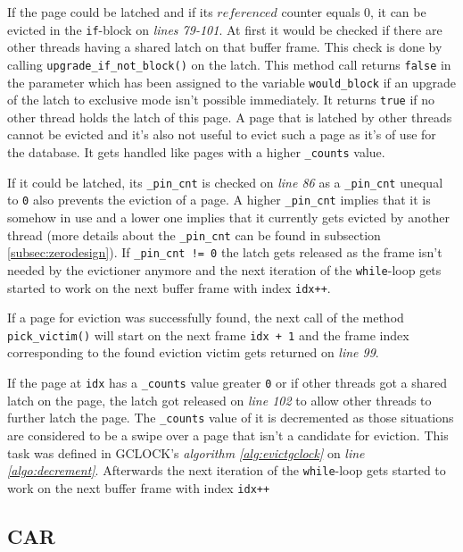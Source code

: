     If the page could be latched and if its $referenced$ counter equals $0$, it can be evicted in the \lstinline{if}-block on \emph{lines 79-101}. At first it would be checked if there are other threads having a shared latch on that buffer frame. This check is done by calling \lstinline{upgrade_if_not_block()} on the latch. This method call returns \lstinline{false} in the parameter which has been assigned to the variable \lstinline{would_block} if an upgrade of the latch to exclusive mode isn't possible immediately. It returns \lstinline{true} if no other thread holds the latch of this page. A page that is latched by other threads cannot be evicted and it's also not useful to evict such a page as it's of use for the database. It gets handled like pages with a higher \lstinline{_counts} value.

    If it could be latched, its \lstinline{_pin_cnt} is checked on \emph{line 86} as a \lstinline{_pin_cnt} unequal to \lstinline{0} also prevents the eviction of a page. A higher \lstinline{_pin_cnt} implies that it is somehow in use and a lower one implies that it currently gets evicted by another thread (more details about the \lstinline{_pin_cnt} can be found in subsection \ref{subsec:zerodesign}). If \lstinline{_pin_cnt != 0} the latch gets released as the frame isn't needed by the evictioner anymore and the next iteration of the \lstinline{while}-loop gets started to work on the next buffer frame with index \lstinline{idx++}.

    If a page for eviction was successfully found, the next call of the method \lstinline{pick_victim()} will start on the next frame \lstinline{idx + 1} and the frame index corresponding to the found eviction victim gets returned on \emph{line 99}.

    If the page at \lstinline{idx} has a \lstinline{_counts} value greater \lstinline{0} or if other threads got a shared latch on the page, the latch got released on \emph{line 102} to allow other threads to further latch the page. The \lstinline{_counts} value of it is decremented as those situations are considered to be a swipe over a page that isn't a candidate for eviction. This task was defined in GCLOCK's \emph{algorithm \ref{alg:evictgclock}} on \emph{line \ref{algo:decrement}}. Afterwards the next iteration of the \lstinline{while}-loop gets started to work on the next buffer frame with index \lstinline{idx++}

\subsection{CAR}

